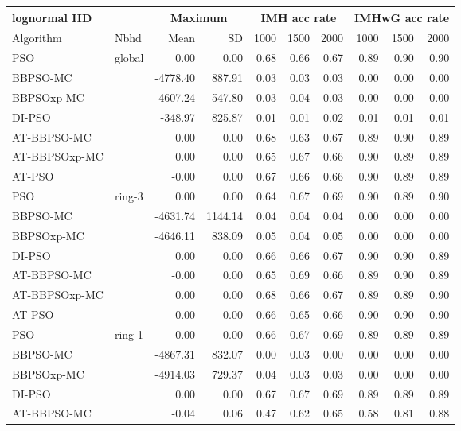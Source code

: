 \documentclass[12pt]{article}
\begin{document}
\begin{table}[h]
\centering
\tiny{
\begin{tabular}{llrr|rrr|rrr}
\multicolumn{2}{l}{lognormal IID} & \multicolumn{2}{c}{Maximum} & \multicolumn{3}{c}{IMH acc rate}  &\multicolumn{3}{c}{IMHwG acc rate}\\
  \hline 
Algorithm & Nbhd & Mean & SD & 1000 & 1500 & 2000 & 1000 & 1500 & 2000 \\ 
  \hline
PSO & global & 0.00 & 0.00 & 0.68 & 0.66 & 0.67 & 0.89 & 0.90 & 0.90 \\ 
  BBPSO-MC &  & -4778.40 & 887.91 & 0.03 & 0.03 & 0.03 & 0.00 & 0.00 & 0.00 \\ 
  BBPSOxp-MC &  & -4607.24 & 547.80 & 0.03 & 0.04 & 0.03 & 0.00 & 0.00 & 0.00 \\ 
  DI-PSO &  & -348.97 & 825.87 & 0.01 & 0.01 & 0.02 & 0.01 & 0.01 & 0.01 \\ 
  AT-BBPSO-MC &  & 0.00 & 0.00 & 0.68 & 0.63 & 0.67 & 0.89 & 0.90 & 0.89 \\ 
  AT-BBPSOxp-MC &  & 0.00 & 0.00 & 0.65 & 0.67 & 0.66 & 0.90 & 0.89 & 0.89 \\ 
  AT-PSO &  & -0.00 & 0.00 & 0.67 & 0.66 & 0.66 & 0.90 & 0.89 & 0.89 \\ \hline
  PSO & ring-3 & 0.00 & 0.00 & 0.64 & 0.67 & 0.69 & 0.90 & 0.89 & 0.90 \\ 
  BBPSO-MC &  & -4631.74 & 1144.14 & 0.04 & 0.04 & 0.04 & 0.00 & 0.00 & 0.00 \\ 
  BBPSOxp-MC &  & -4646.11 & 838.09 & 0.05 & 0.04 & 0.05 & 0.00 & 0.00 & 0.00 \\ 
  DI-PSO &  & 0.00 & 0.00 & 0.66 & 0.66 & 0.67 & 0.90 & 0.90 & 0.89 \\ 
  AT-BBPSO-MC &  & -0.00 & 0.00 & 0.65 & 0.69 & 0.66 & 0.89 & 0.90 & 0.89 \\ 
  AT-BBPSOxp-MC &  & 0.00 & 0.00 & 0.68 & 0.66 & 0.67 & 0.89 & 0.89 & 0.90 \\ 
  AT-PSO &  & 0.00 & 0.00 & 0.66 & 0.65 & 0.66 & 0.90 & 0.90 & 0.90 \\ \hline
  PSO & ring-1 & -0.00 & 0.00 & 0.66 & 0.67 & 0.69 & 0.89 & 0.89 & 0.89 \\ 
  BBPSO-MC &  & -4867.31 & 832.07 & 0.00 & 0.03 & 0.00 & 0.00 & 0.00 & 0.00 \\ 
  BBPSOxp-MC &  & -4914.03 & 729.37 & 0.04 & 0.03 & 0.03 & 0.00 & 0.00 & 0.00 \\ 
  DI-PSO &  & 0.00 & 0.00 & 0.67 & 0.67 & 0.69 & 0.89 & 0.89 & 0.89 \\ 
  AT-BBPSO-MC &  & -0.04 & 0.06 & 0.47 & 0.62 & 0.65 & 0.58 & 0.81 & 0.88 \\ 

\end{tabular}}
\end{table}
\end{document}
